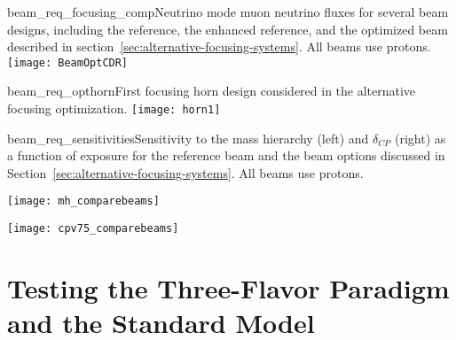 \begin{cdrfigure}
{beam_req_focusing_comp}{Neutrino mode muon 
    neutrino fluxes for several beam designs, including the 
    reference, the enhanced reference, and the optimized beam
    described in section~\ref{sec:alternative-focusing-systems}.  All
    beams use  protons.}
  \texttt{[image: BeamOptCDR]}
\end{cdrfigure}

\begin{cdrfigure}{beam_req_opthorn}{First focusing horn design considered 
    in the alternative focusing optimization. 
}
  \texttt{[image: horn1]}
\end{cdrfigure}

\begin{cdrfigure}
{beam_req_sensitivities}{Sensitivity to the mass hierarchy (left) and
  $\delta_{CP}$ (right) as a function of exposure for the reference beam and
  the beam options discussed in
  Section~\ref{sec:alternative-focusing-systems}.  All beams use  protons.}

\centering 
\begin{minipage}{0.5\textwidth}
\centering 
\texttt{[image: mh\_comparebeams]}
\end{minipage}\hfill 
\begin{minipage}{0.5\textwidth}
\centering 
\texttt{[image: cpv75\_comparebeams]}
\end{minipage} 
\end{cdrfigure}

\section{Testing the Three-Flavor Paradigm and the Standard Model}
\label{sec:physics-lbnosc-3nutests}

